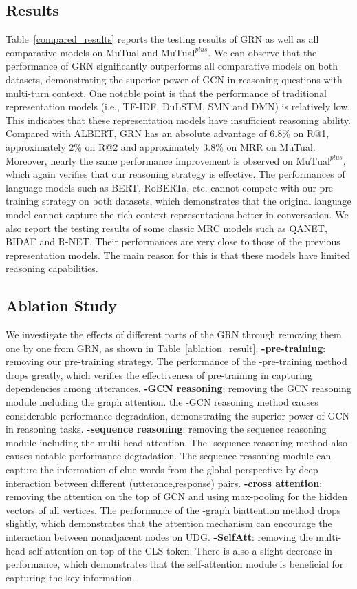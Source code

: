 \documentclass[letterpaper]{article}
\begin{document}
\subsection{Results}
Table~\ref{compared_results} reports the testing results of GRN as well as all comparative models on MuTual and $\text{MuTual}^{plus}$. We can observe that the performance of GRN significantly outperforms all comparative models on both datasets, demonstrating the superior power of GCN in reasoning questions with multi-turn context. One notable point is that the performance of traditional representation models (i.e., TF-IDF, DuLSTM, SMN and DMN) is relatively low. This indicates that these representation models have insufficient reasoning ability. Compared with ALBERT, GRN has an absolute advantage of $6.8\%$ on R@1, approximately $2\%$ on R@2 and approximately $3.8\%$ on MRR on MuTual. Moreover, nearly the same performance improvement is observed on $\text{MuTual}^{plus}$, which again verifies that our reasoning strategy is effective. The performances of language models such as BERT, RoBERTa, etc. cannot compete with our pre-training strategy on both datasets, which demonstrates that the original language model cannot capture the rich context representations better in conversation.
We also report the testing results of some classic MRC models such as QANET, BIDAF and R-NET. Their performances are very close to those of the previous representation models. The main reason for this is that these models have limited reasoning capabilities.

\subsection{Ablation Study}
We investigate the effects of different parts of the GRN through removing them one by one from GRN, as shown in Table~\ref{ablation_result}. \textbf{-pre-training}: removing our pre-training strategy. The performance of the -pre-training method drops greatly, which verifies the effectiveness of pre-training in capturing dependencies among utterances. \textbf{-GCN reasoning}: removing the GCN reasoning module including the graph attention. the -GCN reasoning method causes considerable performance degradation, demonstrating the superior power of GCN in reasoning tasks. \textbf{-sequence reasoning}: removing the sequence reasoning module including the multi-head attention. The -sequence reasoning method also causes notable performance degradation. The sequence reasoning module can capture the information of clue words from the global perspective by deep interaction between different (utterance,response) pairs. \textbf{-cross attention}: removing the attention on the top of GCN and using max-pooling for the hidden vectors of all vertices. The performance of the -graph biattention method drops slightly, which demonstrates that the attention mechanism can encourage the interaction between nonadjacent nodes on UDG. \textbf{-SelfAtt}: removing the multi-head self-attention on top of the CLS token. There is also a slight decrease in performance, which demonstrates that the self-attention module is beneficial for capturing the key information.
\end{document}
